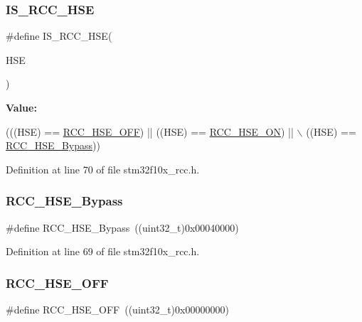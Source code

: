 \subsubsection{\texorpdfstring{I\+S\+\_\+\+R\+C\+C\+\_\+\+H\+SE}{IS\_RCC\_HSE}}
{\footnotesize\ttfamily \#define I\+S\+\_\+\+R\+C\+C\+\_\+\+H\+SE(\begin{DoxyParamCaption}\item[{}]{H\+SE }\end{DoxyParamCaption})}

{\bfseries Value\+:}
\begin{DoxyCode}
(((HSE) == \hyperlink{group___h_s_e__configuration_ga1616626d23fbce440398578855df6f97}{RCC\_HSE\_OFF}) || ((HSE) == \hyperlink{group___h_s_e__configuration_gabc4f70a44776c557af20496b04d9a9db}{RCC\_HSE\_ON}) || \(\backslash\)
                         ((HSE) == \hyperlink{group___h_s_e__configuration_ga09061e9909d5f588baa7bfb0f7edd9fa}{RCC\_HSE\_Bypass}))
\end{DoxyCode}


Definition at line 70 of file stm32f10x\+\_\+rcc.\+h.

\mbox{\label{group___h_s_e__configuration_ga09061e9909d5f588baa7bfb0f7edd9fa}} 
\subsubsection{\texorpdfstring{R\+C\+C\+\_\+\+H\+S\+E\+\_\+\+Bypass}{RCC\_HSE\_Bypass}}
{\footnotesize\ttfamily \#define R\+C\+C\+\_\+\+H\+S\+E\+\_\+\+Bypass~((uint32\+\_\+t)0x00040000)}



Definition at line 69 of file stm32f10x\+\_\+rcc.\+h.

\mbox{\label{group___h_s_e__configuration_ga1616626d23fbce440398578855df6f97}} 
\subsubsection{\texorpdfstring{R\+C\+C\+\_\+\+H\+S\+E\+\_\+\+O\+FF}{RCC\_HSE\_OFF}}
{\footnotesize\ttfamily \#define R\+C\+C\+\_\+\+H\+S\+E\+\_\+\+O\+FF~((uint32\+\_\+t)0x00000000)}



